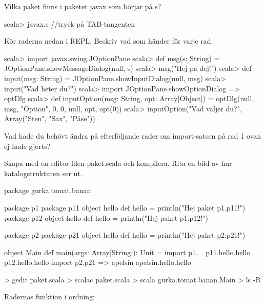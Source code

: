 \Subtask Vilka paket finns i paketet javax som börjar på s?

\begin{REPLnonum}
scala> javax.s   //tryck på TAB-tangenten
\end{REPLnonum}

\Subtask Kör raderna nedan i REPL. Beskriv vad som händer för varje rad.
\begin{REPL}[numbers=left, numberstyle=\color{black}\ttfamily\scriptsize\selectfont]
scala> import javax.swing.JOptionPane
scala> def msg(s: String) = JOptionPane.showMessageDialog(null, s)
scala> msg("Hej på dej!")
scala> def input(msg: String) = JOptionPane.showInputDialog(null, msg)
scala> input("Vad heter du?")
scala> import JOptionPane.{showOptionDialog => optDlg}
scala> def inputOption(msg: String, opt: Array[Object]) =
         optDlg(null, msg, "Option", 0, 0, null, opt, opt(0))
scala> inputOption("Vad väljer du?", Array("Sten", "Sax", "Påse"))
\end{REPL}

\Subtask\Pen Vad hade du behövt ändra på efterföljande rader om import-satsen på rad 1 ovan ej hade gjorts?

\Subtask Skapa med en editor filen paket.scala och kompilera. Rita en bild av hur katalogstrukturen ser ut.

\begin{Code}
package gurka.tomat.banan

package p1 {
  package p11 {
    object hello {
      def hello = println("Hej paket p1.p11!")
    }
  }
  package p12 {
    object hello {
      def hello = println("Hej paket p1.p12!")
    }
  }
}

package p2 {
  package p21 {
    object hello {
      def hello = println("Hej paket p2.p21!")
    }
  }
}

object Main {
  def main(args: Array[String]): Unit = {
    import p1._
    p11.hello.hello
    p12.hello.hello
    import p2.{p21 => apelsin}
    apelsin.hello.hello
  }
}
\end{Code}

\begin{REPL}
> gedit paket.scala
> scalac paket.scala
> scala gurka.tomat.banan.Main
> ls -R
\end{REPL}

\SOLUTION


\TaskSolved \what


\SubtaskSolved  {}

\SubtaskSolved  Radernas funktion i ordning:

